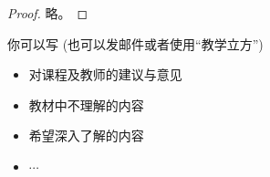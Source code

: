 \documentclass[a4paper, justified]{tufte-handout}
\begin{document}
\begin{proof}
  略。
\end{proof}

\begincorrection

\beginfb

你可以写 (也可以发邮件或者使用``教学立方'')
\begin{itemize}
  \item 对课程及教师的建议与意见
  \item 教材中不理解的内容
  \item 希望深入了解的内容
  \item $\cdots$
\end{itemize}
\end{document}
